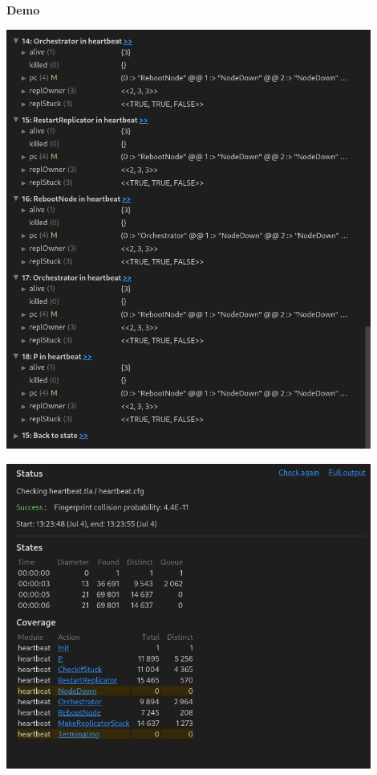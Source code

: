 \documentclass{beamer}
\begin{document}
\begin{frame}
    \begin{center}
        \LARGE{\textbf{Demo}}
    \end{center}

\end{frame}

\begin{frame}
    \includegraphics[width=0.9\textwidth, height=0.9\textheight]{examples/img1.png}
\end{frame}


\begin{frame}
    \includegraphics[width=0.9\textwidth, height=0.9\textheight]{examples/img2.png}
\end{frame}
\end{document}

